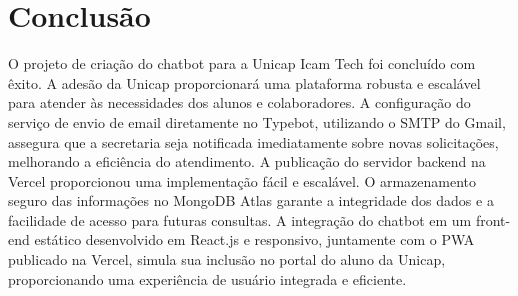 \documentclass[12pt,a4paper]{article} %
\begin{document}
\section{Conclusão}
O projeto de criação do chatbot para a Unicap Icam Tech foi concluído com êxito. A adesão da Unicap proporcionará uma plataforma robusta e escalável para atender às necessidades dos alunos e colaboradores. A configuração do serviço de envio de email diretamente no Typebot, utilizando o SMTP do Gmail, assegura que a secretaria seja notificada imediatamente sobre novas solicitações, melhorando a eficiência do atendimento. A publicação do servidor backend na Vercel proporcionou uma implementação fácil e escalável. O armazenamento seguro das informações no MongoDB Atlas garante a integridade dos dados e a facilidade de acesso para futuras consultas. A integração do chatbot em um front-end estático desenvolvido em React.js e responsivo, juntamente com o PWA publicado na Vercel, simula sua inclusão no portal do aluno da Unicap, proporcionando uma experiência de usuário integrada e eficiente.
\end{document}
